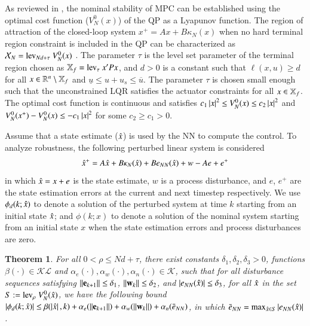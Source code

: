 \documentclass[preprint,5p, twocolumn, authoryear]{elsarticle}
\newtheorem{thm}{Theorem}
\begin{document}
As reviewed in \cite*{mayne:rawlings:rao:scokaert:2000}, the nominal stability
of MPC can be established using the optimal cost function ($V_N^0(x)$) of the QP
as a Lyapunov function. The region of attraction of the closed-loop system $x^+
= Ax + B\kappa_N(x)$ when no hard terminal region constraint is included in the
QP can be characterized as $\mathcal{X}_N = \textnormal{lev}_{Nd + \tau} \
V_N^0(x)$ \citep*{limon:alamo:salas:camacho:2006}. The parameter $\tau$ is the
level set parameter of the terminal region chosen as $\mathbb{X}_f =
\textnormal{lev}_{\tau} \ x'Px$, and $d > 0$ is a constant such that $\ell(x, u)
\geq d$ for all $x \in \mathbb{R}^n \setminus \mathbb{X}_f$ and $\underline{u} \leq u+u_s
\leq \overline{u}$. The parameter $\tau$ is chosen small enough such that the
unconstrained LQR satisfies the actuator constraints for all $x \in \mathbb{X}_f$. The
optimal cost function is continuous and satisfies $c_1\left| x \right|^2 \leq V_N^0(x)
\leq c_2\left| x \right|^2$ and $V_N^0(x^+) - V_N^0(x) \leq -c_1\left| x \right|^2$ for some
$c_2 \geq c_1 > 0$.

Assume that a state estimate ($\hat{x}$) is used by the NN to compute the control.
To analyze robustness, the following perturbed linear system is considered
\begin{align} \label{eq:perturbed_sys}
    \hat{x}^+ = A\hat{x} + B\kappa_N(\hat{x}) + Be_{NN}(\hat{x}) + w - Ae + e^+
\end{align}
in which $\hat{x} = x + e$ is the state estimate, $w$ is a process disturbance,
and $e$, $e^+$ are the state estimation errors at the current and next timestep
respectively. We use $\phi_d(k;\hat{x})$ to denote a solution of the perturbed
system  at time $k$ starting from an initial state $\hat{x}$; and $\phi(k;x)$ to
denote a solution  of the nominal system starting  from an initial state $x$
when the state estimation errors and process disturbances are zero.

\begin{thm} \label{thm:nnrobustness} For all $ 0 < \rho \leq Nd + \tau$, there
exist constants $\delta_1, \delta_2, \delta_3 > 0$, functions $\beta(\cdot) \in
\mathcal{K} \mathcal{L}$ and $\alpha_e(\cdot) , \alpha_w(\cdot),
\alpha_{n}(\cdot) \in \mathcal{K}$, such that for all disturbance sequences
satisfying $\left| \left| \mathbf{e}_{k+1} \right| \right| \leq \delta_1$,
$\left| \left| \mathbf{w}_k \right| \right| \leq \delta_2$, and $\left| e_{NN}(\hat{x}) \right| \leq
\delta_3$, for all $\hat{x}$ in the set $S := \textnormal{lev}_{\rho} \
V_N^0(\hat{x})$, we have the following bound $\left| \phi_d(k; \hat{x}) \right| \leq
\beta(\left| \hat{x} \right|, k) + \alpha_e(\left| \left| \mathbf{e}_{k+1} \right| \right|) +
\alpha_w(\left| \left| \mathbf{w}_k \right| \right|) + \alpha_n(\bar{e}_{NN})$, in which
$\bar{e}_{NN} = \textnormal{max}_{\hat{x} \in S} \left| e_{NN}(\hat{x}) \right|$.
\end{thm}
\end{document}
